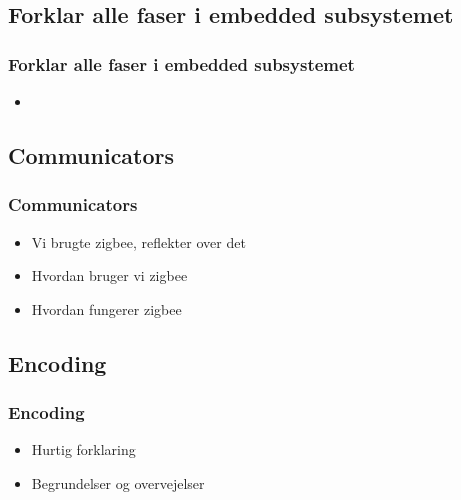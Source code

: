 \subsection{Forklar alle faser i embedded subsystemet}
\begin{frame}
	\frametitle{Forklar alle faser i embedded subsystemet}
	\begin{itemize}
		\item 
	\end{itemize}
\end{frame}

\subsection{Communicators}
\begin{frame}
	\frametitle{Communicators}
	\begin{itemize}
		\item Vi brugte zigbee, reflekter over det
		\item Hvordan bruger vi zigbee
		\item Hvordan fungerer zigbee
	\end{itemize}
\end{frame}

\subsection{Encoding}
\begin{frame}
	\frametitle{Encoding}
	\begin{itemize}
		\item Hurtig forklaring
		\item Begrundelser og overvejelser
	\end{itemize}
\end{frame}
